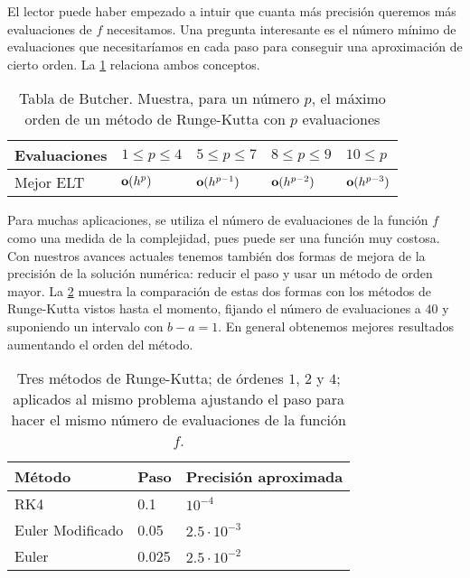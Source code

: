 El lector puede haber empezado a intuir que cuanta más precisión queremos
más evaluaciones de $f$ necesitamos.
Una pregunta interesante es
el número mínimo de evaluaciones que necesitaríamos en cada paso
para conseguir una aproximación de cierto orden.
La \cref{tab:butcher} relaciona ambos conceptos.

\begin{table}[H]
    \centering
    \begin{tabular}{|l||l|l|l|l|}
        \hline
        Evaluaciones & $1\le p\le 4$ & $5\le p\le 7$ & $8\le p\le 9$
            & $10\le p$ \\
        \hline
        Mejor ELT & $\vb{o}(h^p)$ & $\vb{o}(h^{p-1})$ & $\vb{o}(h^{p-2})$
            & $\vb{o}(h^{p-3})$ \\
        \hline
    \end{tabular}
    \caption{Tabla de Butcher.
        Muestra, para un número $p$,
        el máximo orden de un método de Runge-Kutta con $p$ evaluaciones
    }
    \label{tab:butcher}
\end{table}

Para muchas aplicaciones,
se utiliza el número de evaluaciones de la función $f$
como una medida de la complejidad,
pues puede ser una función muy costosa.
Con nuestros avances actuales tenemos también dos formas de mejora
de la precisión de la solución numérica:
reducir el paso
y usar un método de orden mayor.
La \cref{tab:order-vs-step} muestra la comparación de estas dos formas
con los métodos de Runge-Kutta vistos hasta el momento,
fijando el número de evaluaciones a $40$
y suponiendo un intervalo con $b - a = 1$.
En general obtenemos mejores resultados aumentando el orden del método.

\begin{table}[H]
    \centering
    \begin{tabular}{|l|l|l|}
        \hline
    Método           & Paso  & Precisión aproximada \\
        \hline
        \hline
    RK4              & 0.1   & $10^{-4}$ \\
        \hline
    Euler Modificado & 0.05  & $2.5\cdot 10^{-3}$ \\
        \hline
    Euler            & 0.025 & $2.5\cdot 10^{-2}$ \\
        \hline
    \end{tabular}
    \caption{Tres métodos de Runge-Kutta;
        de órdenes $1$, $2$ y $4$;
        aplicados al mismo problema ajustando el paso
        para hacer el mismo número de evaluaciones de la función $f$.
    }
    \label{tab:order-vs-step}
\end{table}

